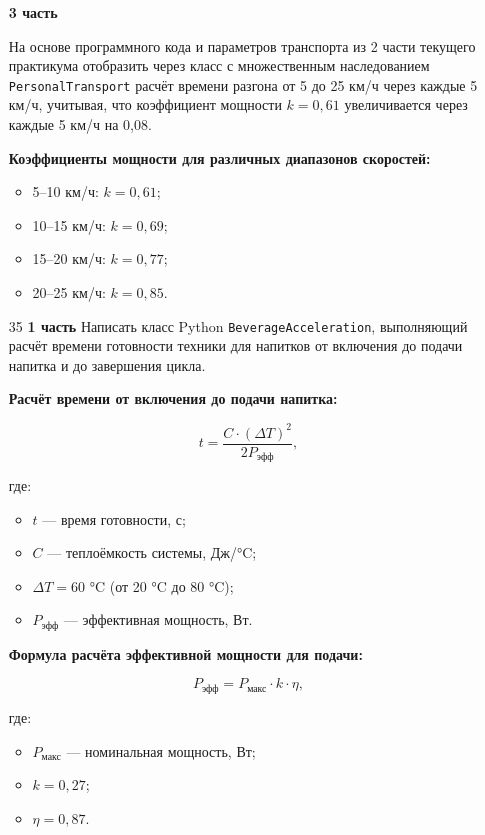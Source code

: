 \begin{enumerate}
\textbf{3 часть}

На основе программного кода и параметров транспорта из 2 части текущего практикума отобразить через класс с множественным наследованием \texttt{PersonalTransport} расчёт времени разгона от 5 до 25 км/ч через каждые 5 км/ч, учитывая, что коэффициент мощности $k = 0{,}61$ увеличивается через каждые 5 км/ч на 0{,}08.

\textbf{Коэффициенты мощности для различных диапазонов скоростей:}
\begin{itemize}
    \item 5–10 км/ч: $k = 0{,}61$;  
    \item 10–15 км/ч: $k = 0{,}69$;  
    \item 15–20 км/ч: $k = 0{,}77$;  
    \item 20–25 км/ч: $k = 0{,}85$.  
\end{itemize}


\item[35] \textbf{1 часть}  
Написать класс Python \texttt{BeverageAcceleration}, выполняющий расчёт времени готовности техники для напитков от включения до подачи напитка и до завершения цикла.

\textbf{Расчёт времени от включения до подачи напитка:}

\begin{equation}
t = \frac{C \cdot (\Delta T)^2}{2P_{\text{эфф}}},
\end{equation}

где:  
\begin{itemize}
    \item $t$ — время готовности, с;  
    \item $C$ — теплоёмкость системы, Дж/°C;  
    \item $\Delta T = 60$ °C (от 20 °C до 80 °C);  
    \item $P_{\text{эфф}}$ — эффективная мощность, Вт.  
\end{itemize}

\textbf{Формула расчёта эффективной мощности для подачи:}

\begin{equation}
P_{\text{эфф}} = P_{\text{макс}} \cdot k \cdot \eta,
\end{equation}

где:  
\begin{itemize}
    \item $P_{\text{макс}}$ — номинальная мощность, Вт;  
    \item $k = 0{,}27$;  
    \item $\eta = 0{,}87$.  
\end{itemize}


\end{enumerate}
